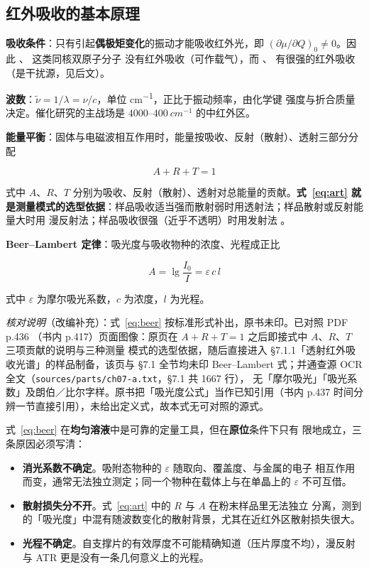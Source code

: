 \subsection{红外吸收的基本原理}

\begin{principle}
\textbf{吸收条件}：只有引起\textbf{偶极矩变化}的振动才能吸收红外光，即
$\left(\partial\mu/\partial Q\right)_{0}\neq0$。因此 、 这类同核双原子分子
没有红外吸收（可作载气），而 、 有很强的红外吸收（是干扰源，见后文）。

\textbf{波数}：$\tilde{\nu}=1/\lambda=\nu/c$，单位 \unit{cm^{-1}}，正比于振动频率，由化学键
强度与折合质量决定。催化研究的主战场是 $4000$--$\qty{400}{cm^{-1}}$ 的中红外区。

\textbf{能量平衡}：固体与电磁波相互作用时，能量按吸收、反射（散射）、透射三部分分配

\begin{equation}\label{eq:art}
A+R+T=1
\end{equation}

式中 $A$、$R$、$T$ 分别为吸收、反射（散射）、透射对总能量的贡献。\textbf{式~\eqref{eq:art}
就是测量模式的选型依据}：样品吸收适当强而散射弱时用透射法；样品散射或反射能量大时用
漫反射法；样品吸收很强（近乎不透明）时用发射法
。

\textbf{Beer--Lambert 定律}：吸光度与吸收物种的浓度、光程成正比

\begin{equation}\label{eq:beer}
A=\lg\frac{I_{0}}{I}=\varepsilon\,c\,l
\end{equation}

式中 $\varepsilon$ 为摩尔吸光系数，$c$ 为浓度，$l$ 为光程。
\end{principle}

\emph{核对说明}（改编补充）：式~\eqref{eq:beer} 按标准形式补出，原书未印。已对照 PDF p.436
（书内 p.417）页面图像：原页在 $A+R+T=1$ 之后即接式中 $A$、$R$、$T$ 三项贡献的说明与三种测量
模式的选型依据，随后直接进入 §7.1.1「透射红外吸收光谱」的样品制备，该页与 §7.1 全节均未印
Beer--Lambert 式；并通查源 OCR 全文（\texttt{sources/parts/ch07-a.txt}，§7.1 共 1667 行），
无「摩尔吸光」「吸光系数」及朗伯／比尔字样。原书把「吸光度公式」当作已知引用（书内 p.437
时间分辨一节直接引用），未给出定义式，故本式无可对照的源式。

式~\eqref{eq:beer} 在\textbf{均匀溶液}中是可靠的定量工具，但在\textbf{原位}条件下只有
限地成立，三条原因必须写清：

\begin{itemize}
\item \textbf{消光系数不确定}。吸附态物种的 $\varepsilon$ 随取向、覆盖度、与金属的电子
相互作用而变，通常无法独立测定；同一个物种在载体上与在单晶上的 $\varepsilon$ 不可互借。
\item \textbf{散射损失分不开}。式~\eqref{eq:art} 中的 $R$ 与 $A$ 在粉末样品里无法独立
分离，测到的「吸光度」中混有随波数变化的散射背景，尤其在近红外区散射损失很大。
\item \textbf{光程不确定}。自支撑片的有效厚度不可能精确知道（压片厚度不均），漫反射与
ATR 更是没有一条几何意义上的光程。
\end{itemize}

